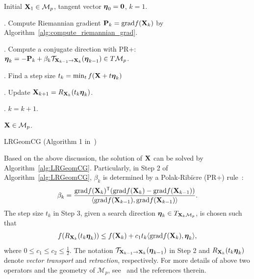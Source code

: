 \documentclass[letterpaper]{article} %
\def\ranksym{p}
\def\M{\mathcal{M}}
\def\trsp{{\sf T}}
\def\0{{\bf 0}}
\def\grad{{\text{grad}}}
\def\bfeta{\mbox{{\boldmath $\eta$}}}
\def\mT{{\mathcal T}}
\def\bX{{\bf X}}
\def\bX{{\bf X}}
\def\bP{{\bf P}}
\begin{document}
\begin{algorithm}
  \begin{algorithmic}
    \REQUIRE Initial $\bX_{1} \in \M_{\ranksym}$, tangent vector $\bfeta_{0} = \0$, $k = 1$.


      . Compute Riemannian gradient $\bP_{k} = \grad f(\bX_{k})$ by Algorithm~\ref{alg:compute_riemannian_grad}.

      . Compute a conjugate direction with PR+:
             $\bfeta_k = - \bP_{k} + \beta_{k} \mT_{\bX_{k-1} \rightarrow \bX_{k}}( \bfeta_{k-1}) \in T\M_{\ranksym}$.

      . Find a step size $t_{k} = \min_{t} f(\bX + t\bfeta_{k}) $

      . Update $\bX_{k+1} = R_{\bX_{k}}(t_{k} \bfeta_{k})$.

      . $k = k + 1$.

    \ENDWHILE

    \ENSURE $\bX \in \M_{\ranksym}$.

  \end{algorithmic}
  \caption{LRGeomCG (Algorithm 1 in~\cite{vandereycken2013lowrank})}
  \label{alg:LRGeomCG}
\end{algorithm}


Based on the above discussion, the solution of $\bX$ can be solved by Algorithm~\ref{alg:LRGeomCG}.
Particularly, in Step 2 of Algorithm~\ref{alg:LRGeomCG}, $\beta_{k}$ is determined by a Polak-Ribi$\grave{e}$re (PR+) rule~\cite{vandereycken2013lowrank}:
{\small
\begin{eqnarray}\label{eq:beta}
\beta_{k} = \frac{\grad f(\bX_{k})^{\trsp}(\grad f(\bX_{k}) - \grad f(\bX_{k-1}))}{\langle \grad f(\bX_{k-1}),\grad f(\bX_{k-1})\rangle}.
\end{eqnarray}
}
\noindent
The step size $t_{k}$ in Step 3, given a search direction $\bfeta_{k} \in T_{\bX_{k} \M_{\ranksym}}$, is chosen such that
{\small
\begin{align}\label{eq:choose_step_size}
  f(R_{\bX_{k}} (t_{k} \bfeta_{k})) \leq f(\bX_{k}) + c_{1} t_{k} \langle \grad f(\bX_{k}), \bfeta_{k} \rangle ,
\end{align}
}
\noindent
where $0 \leq c_{1} \leq c_{2} \leq \frac{1}{2}$.
The notation $\mT_{\bX_{k-1} \rightarrow \bX_{k}} (\bfeta_{k-1})$ in Step 2 and $R_{\bX_{k}} (t_k \bfeta_{k})$ denote \emph{vector transport} and \emph{retraction}, respectively.
For more details of above two operators and the geometry of $\M_{\ranksym}$, see~\cite{vandereycken2013lowrank} and the references therein.
\end{document}
